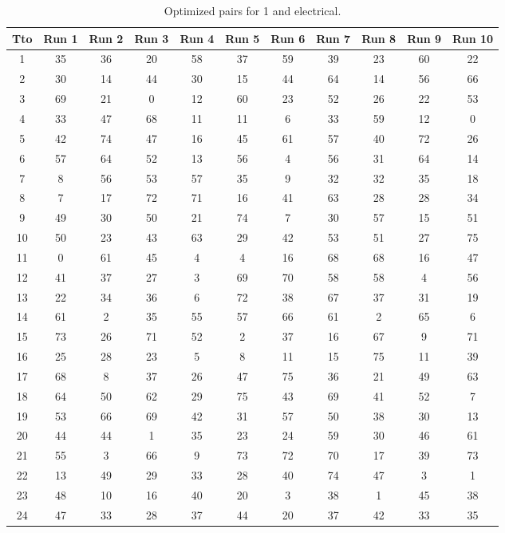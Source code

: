 \begin{table}
  \centering
  \scriptsize
  \caption{Optimized pairs for 1 and electrical.}
  \label{tab_pairs}
\begin{tabular}{c c c c c c c c c c c }
\hline
Tto & Run 1 & Run 2 & Run 3 & Run 4 & Run 5 & Run 6 & Run 7 & Run 8 & Run 9 & Run 10 \\
\hline
1 & 35 & 36 & 20 & 58 & 37 & 59 & 39 & 23 & 60 & 22 \\
2 & 30 & 14 & 44 & 30 & 15 & 44 & 64 & 14 & 56 & 66 \\
3 & 69 & 21 & 0 & 12 & 60 & 23 & 52 & 26 & 22 & 53 \\
4 & 33 & 47 & 68 & 11 & 11 & 6 & 33 & 59 & 12 & 0 \\
5 & 42 & 74 & 47 & 16 & 45 & 61 & 57 & 40 & 72 & 26 \\
6 & 57 & 64 & 52 & 13 & 56 & 4 & 56 & 31 & 64 & 14 \\
7 & 8 & 56 & 53 & 57 & 35 & 9 & 32 & 32 & 35 & 18 \\
8 & 7 & 17 & 72 & 71 & 16 & 41 & 63 & 28 & 28 & 34 \\
9 & 49 & 30 & 50 & 21 & 74 & 7 & 30 & 57 & 15 & 51 \\
10 & 50 & 23 & 43 & 63 & 29 & 42 & 53 & 51 & 27 & 75 \\
11 & 0 & 61 & 45 & 4 & 4 & 16 & 68 & 68 & 16 & 47 \\
12 & 41 & 37 & 27 & 3 & 69 & 70 & 58 & 58 & 4 & 56 \\
13 & 22 & 34 & 36 & 6 & 72 & 38 & 67 & 37 & 31 & 19 \\
14 & 61 & 2 & 35 & 55 & 57 & 66 & 61 & 2 & 65 & 6 \\
15 & 73 & 26 & 71 & 52 & 2 & 37 & 16 & 67 & 9 & 71 \\
16 & 25 & 28 & 23 & 5 & 8 & 11 & 15 & 75 & 11 & 39 \\
17 & 68 & 8 & 37 & 26 & 47 & 75 & 36 & 21 & 49 & 63 \\
18 & 64 & 50 & 62 & 29 & 75 & 43 & 69 & 41 & 52 & 7 \\
19 & 53 & 66 & 69 & 42 & 31 & 57 & 50 & 38 & 30 & 13 \\
20 & 44 & 44 & 1 & 35 & 23 & 24 & 59 & 30 & 46 & 61 \\
21 & 55 & 3 & 66 & 9 & 73 & 72 & 70 & 17 & 39 & 73 \\
22 & 13 & 49 & 29 & 33 & 28 & 40 & 74 & 47 & 3 & 1 \\
23 & 48 & 10 & 16 & 40 & 20 & 3 & 38 & 1 & 45 & 38 \\
24 & 47 & 33 & 28 & 37 & 44 & 20 & 37 & 42 & 33 & 35 \\

\end{tabular}
\end{table}
